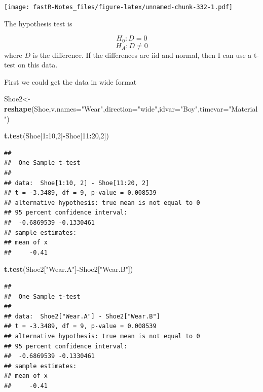 \documentclass[]{book}
\newenvironment{Shaded}{\begin{snugshade}}{\end{snugshade}}
\newcommand{\KeywordTok}[1]{\textcolor[rgb]{0.13,0.29,0.53}{\textbf{#1}}}
\newcommand{\DataTypeTok}[1]{\textcolor[rgb]{0.13,0.29,0.53}{#1}}
\newcommand{\DecValTok}[1]{\textcolor[rgb]{0.00,0.00,0.81}{#1}}
\newcommand{\StringTok}[1]{\textcolor[rgb]{0.31,0.60,0.02}{#1}}
\newcommand{\OperatorTok}[1]{\textcolor[rgb]{0.81,0.36,0.00}{\textbf{#1}}}
\newcommand{\NormalTok}[1]{#1}
\theoremstyle{definition}
\theoremstyle{definition}
\theoremstyle{definition}
\theoremstyle{remark}
\begin{document}
\texttt{[image: fastR-Notes\_files/figure-latex/unnamed-chunk-332-1.pdf]}

The hypothesis test is

\[H_{0}: D = 0\] \[H_{A}: D \neq 0\] where \(D\) is the difference. If
the differences are iid and normal, then I can use a t-test on this
data.

First we could get the data in wide format

\begin{Shaded}
\begin{Highlighting}[]
\NormalTok{Shoe2<-}\KeywordTok{reshape}\NormalTok{(Shoe,}\DataTypeTok{v.names=}\StringTok{"Wear"}\NormalTok{,}\DataTypeTok{direction=}\StringTok{"wide"}\NormalTok{,}\DataTypeTok{idvar=}\StringTok{"Boy"}\NormalTok{,}\DataTypeTok{timevar=}\StringTok{"Material"}\NormalTok{)}
\end{Highlighting}
\end{Shaded}

\begin{Shaded}
\begin{Highlighting}[]
\KeywordTok{t.test}\NormalTok{(Shoe[}\DecValTok{1}\OperatorTok{:}\DecValTok{10}\NormalTok{,}\DecValTok{2}\NormalTok{]}\OperatorTok{-}\NormalTok{Shoe[}\DecValTok{11}\OperatorTok{:}\DecValTok{20}\NormalTok{,}\DecValTok{2}\NormalTok{])}
\end{Highlighting}
\end{Shaded}

\begin{verbatim}
## 
##  One Sample t-test
## 
## data:  Shoe[1:10, 2] - Shoe[11:20, 2]
## t = -3.3489, df = 9, p-value = 0.008539
## alternative hypothesis: true mean is not equal to 0
## 95 percent confidence interval:
##  -0.6869539 -0.1330461
## sample estimates:
## mean of x 
##     -0.41
\end{verbatim}

\begin{Shaded}
\begin{Highlighting}[]
\KeywordTok{t.test}\NormalTok{(Shoe2[}\StringTok{"Wear.A"}\NormalTok{]}\OperatorTok{-}\NormalTok{Shoe2[}\StringTok{"Wear.B"}\NormalTok{])}
\end{Highlighting}
\end{Shaded}

\begin{verbatim}
## 
##  One Sample t-test
## 
## data:  Shoe2["Wear.A"] - Shoe2["Wear.B"]
## t = -3.3489, df = 9, p-value = 0.008539
## alternative hypothesis: true mean is not equal to 0
## 95 percent confidence interval:
##  -0.6869539 -0.1330461
## sample estimates:
## mean of x 
##     -0.41
\end{verbatim}
\end{document}
